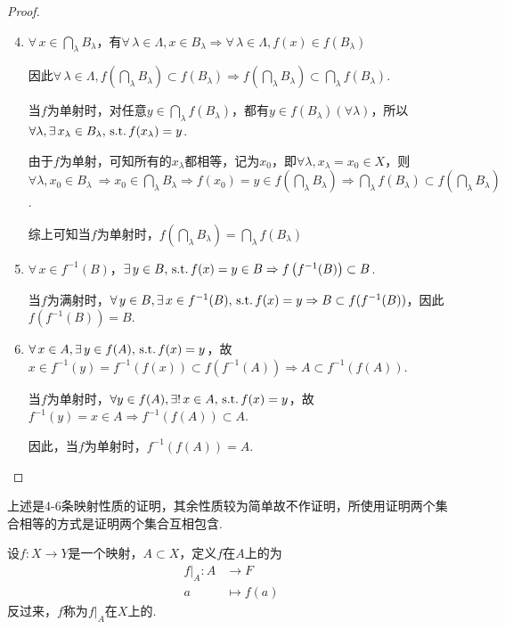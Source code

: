 \begin{proof}
    \begin{enumerate}
        \setcounter{enumi}{3}
        \item $\forall\, x\in \bigcap_{\lambda}{B_\lambda}$，有$\forall\,\lambda\in\Lambda,x\in B_{\lambda} \Rightarrow \forall\,\lambda\in\Lambda,f(x)\in f \left(B_\lambda\right)$\par
        因此$\forall\,\lambda\in\Lambda,f\left(\bigcap_{\lambda}{B_\lambda}\right)\subset f(B_\lambda)\Rightarrow f\left(\bigcap_{\lambda}{B_\lambda}\right)\subset\bigcap_{\lambda}{f(B_\lambda)}$.\par
        当$f$为单射时，对任意$y\in \bigcap_{\lambda}{f(B_\lambda)}$，都有$y\in f(B_\lambda)(\forall \lambda)$，所以$\forall \lambda,\exists\, x_\lambda\in B_\lambda,\operatorname{\,\text{s.t.}} f(x_\lambda)=y$.\par
        由于$f$为单射，可知所有的$x_\lambda$都相等，记为$x_0$，即$\forall \lambda,x_\lambda=x_0 \in X$，则$\forall \lambda,x_0\in B_\lambda\ \Rightarrow x_0\in\bigcap_{\lambda}{B_\lambda} \Rightarrow f(x_0)=y\in f\left(\bigcap_\lambda{B_\lambda}\right) \Rightarrow \bigcap_{\lambda}{f(B_\lambda)}\subset f\left(\bigcap_\lambda{B_\lambda}\right)$.\par
        综上可知当$f$为单射时，$f\left(\bigcap_{\lambda}{B_\lambda}\right) = \bigcap_{\lambda}{f(B_\lambda)}$
        \item $\forall\, x\in f^{-1}(B)$，$\exists\, y\in B,\operatorname{\,\text{s.t.}} f(x)=y\in B \Rightarrow f\left(f^{-1}(B)\right)\subset B$.\par
        当$f$为满射时，$\forall\, y\in B,\exists\, x\in f^{-1}(B),\operatorname{\,\text{s.t.}} f(x)=y \Rightarrow B \subset f(f^{-1}(B))$，因此$f\left(f^{-1}(B)\right)= B$.
        \item $\forall\, x\in A,\exists\, y\in f(A),\operatorname{\,\text{s.t.}} f(x)=y$，故$x\in f^{-1}(y) = f^{-1}(f(x)) \subset f(f^{-1}(A)) \Rightarrow A\subset f^{-1}(f(A))$.\par
        当$f$为单射时，$\forall y\in f(A),\exists!\, x\in A,\operatorname{\,\text{s.t.}} f(x)=y$，故$f^{-1}(y)=x\in A \Rightarrow f^{-1}(f(A))\subset A$.\par
        因此，当$f$为单射时，$f^{-1}(f(A))=A$.\qedhere
    \end{enumerate}
\end{proof}

上述是4-6条映射性质的证明，其余性质较为简单故不作证明，所使用证明两个集合相等的方式是证明两个集合互相包含.


\begin{definition}[映射的限制][def:1.8]
    设$f:X\to Y$是一个映射，$A\subset X$，定义$f$在$A$上的为
    \begin{align*}
        f|_A :A &\to F \\
        a &\mapsto f(a)
    \end{align*}
    反过来，$f$称为$f|_A$在$X$上的.
\end{definition}

